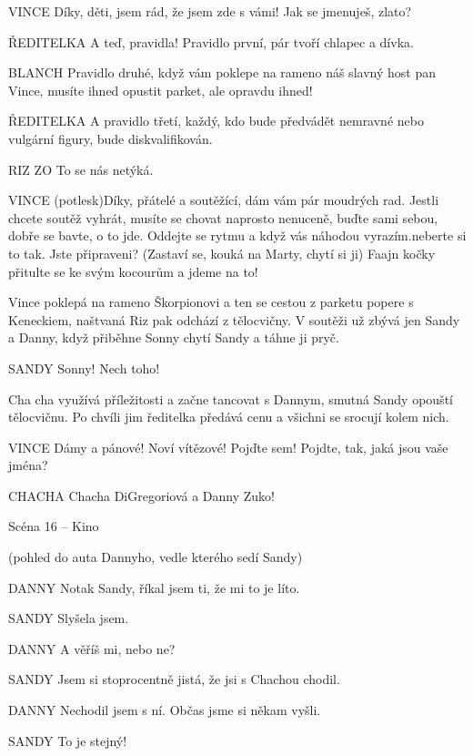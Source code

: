 VINCE        Díky, děti, jsem rád, že jsem zde s vámi! Jak se jmenuješ, zlato? 

ŘEDITELKA        A teď, pravidla!         Pravidlo první, pár tvoří chlapec a dívka. 

BLANCH            Pravidlo druhé, když vám poklepe na rameno náš slavný host pan Vince, musíte ihned opustit parket, ale opravdu ihned! 

ŘEDITELKA        A pravidlo třetí, každý, kdo bude předvádět nemravné nebo vulgární         figury, bude diskvalifikován. 

RIZ        ZO        To se nás netýká. 

VINCE        (potlesk)Díky, přátelé a soutěžící, dám vám pár moudrých rad. Jestli                 chcete soutěž vyhrát, musíte se chovat naprosto nenuceně, buďte sami         sebou, dobře se bavte, o to jde. Oddejte se rytmu a když vás náhodou         vyrazím.neberte si to tak. Jste  připraveni? (Zastaví se, kouká na Marty,         chytí si ji) Faajn kočky přitulte se ke svým kocourům a jdeme na to!

Vince poklepá na rameno Škorpionovi a ten se cestou z parketu popere s Keneckiem, naštvaná Riz pak odchází z tělocvičny. V soutěži už zbývá jen Sandy a Danny, když přiběhne Sonny chytí Sandy a táhne ji pryč.

SANDY        Sonny! Nech toho!

Cha cha využívá příležitosti a začne tancovat s Dannym, smutná Sandy opouští tělocvičnu. Po chvíli jim ředitelka předává cenu a všichni se srocují kolem nich. 

VINCE        Dámy a pánové! Noví vítězové! Pojďte sem! Pojdte, tak, jaká jsou vaše         jména?

CHACHA        Chacha DiGregoriová a Danny Zuko!





Scéna 16  – Kino 

(pohled do auta Dannyho, vedle kterého sedí Sandy)

DANNY        Notak Sandy, říkal jsem ti, že mi to je líto. 

SANDY        Slyšela jsem. 

DANNY        A věříš mi, nebo ne?

SANDY        Jsem si stoprocentně jistá, že jsi s Chachou chodil. 

DANNY        Nechodil jsem s ní. Občas jsme si někam vyšli.

SANDY        To je stejný!

